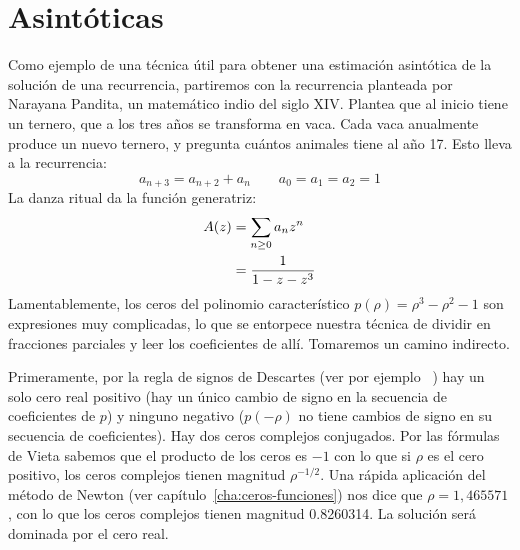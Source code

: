 \section{Asintóticas}
\label{sec:asymptotics-recurrence}

  Como ejemplo de una técnica útil para obtener una estimación asintótica
  de la solución de una recurrencia,
  partiremos con la recurrencia planteada por Narayana Pandita,
  un matemático indio del siglo XIV.
  Plantea que al inicio tiene un ternero,
  que a los tres años se transforma en vaca.
  Cada vaca anualmente produce un nuevo ternero,
  y pregunta cuántos animales tiene al año \num{17}.
  Esto lleva a la recurrencia:
  \begin{equation}
    \label{eq:Narayana-cows-recurrence}
    a_{n + 3}
      = a_{n + 2} + a_n
      \qquad a_0 = a_1 = a_2 = 1
  \end{equation}
  La danza ritual da la función generatriz:
  \begin{align}
    A(z)
      &= \sum_{n \ge 0} a_n z^n
            \notag \\
      &= \frac{1}{1 - z - z^3}
            \label{eq:Narayana-cows-gf}
  \end{align}
  Lamentablemente,
  los ceros del polinomio característico \(p(\rho) = \rho^3 - \rho^2 - 1\)
  son expresiones muy complicadas,
  lo que se entorpece nuestra técnica de dividir en fracciones parciales
  y leer los coeficientes de allí.
  Tomaremos un camino indirecto.

  Primeramente,
  por la regla de signos de Descartes
  (ver por ejemplo~%
      \cite{levin20:_descartes_rule_signs})
  hay un solo cero real positivo
  (hay un único cambio de signo en la secuencia de coeficientes de \(p\))
  y ninguno negativo
  (\(p(-\rho)\) no tiene cambios de signo en su secuencia de coeficientes).
  Hay dos ceros complejos conjugados.
  Por las fórmulas de Vieta
  sabemos que el producto de los ceros es \(-1\)
  con lo que si \(\rho\) es el cero positivo,
  los ceros complejos tienen magnitud \(\rho^{-1/2}\).
  Una rápida aplicación del método de Newton
  (ver capítulo~\ref{cha:ceros-funciones})
  nos dice que \(\rho = 1,465571\),
  con lo que los ceros complejos tienen magnitud \num{0,8260314}.
  La solución será dominada por el cero real.

